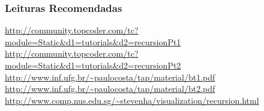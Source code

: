 \begin{frame}
\frametitle{Leituras Recomendadas}

\begin{block}{}
\begin{itemize}
\tiny
	\bitem \url{http://community.topcoder.com/tc?module=Static&d1=tutorials&d2=recursionPt1}
	\bitem \url{http://community.topcoder.com/tc?module=Static&d1=tutorials&d2=recursionPt2}
	\bitem \url{http://www.inf.ufg.br/~paulocosta/tap/material/bt1.pdf}
	\bitem \url{http://www.inf.ufg.br/~paulocosta/tap/material/bt2.pdf}
	\bitem \url{http://www.comp.nus.edu.sg/~stevenha/visualization/recursion.html}
\end{itemize}
\end{block}

\end{frame}
